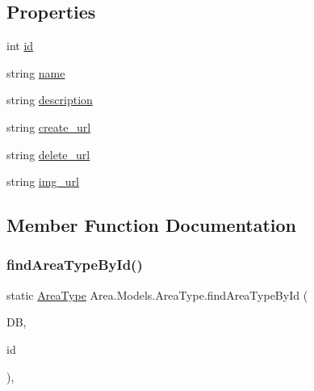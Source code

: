 \subsection*{Properties}
\begin{DoxyCompactItemize}
\item 
int \mbox{\hyperlink{classArea_1_1Models_1_1AreaType_a334470e1882a0d27aad7dc0a180e5b0b}{id}}
\item 
string \mbox{\hyperlink{classArea_1_1Models_1_1AreaType_a96fa53a9c8d977d9a3afa7e501a862fa}{name}}
\item 
string \mbox{\hyperlink{classArea_1_1Models_1_1AreaType_a9e4921cb37dd5d3eca61455c28f399b0}{description}}
\item 
string \mbox{\hyperlink{classArea_1_1Models_1_1AreaType_a57a0e360895801c2f41c626d27becc17}{create\+\_\+url}}
\item 
string \mbox{\hyperlink{classArea_1_1Models_1_1AreaType_a5714a6004dd5fab7a60158bfcb609da8}{delete\+\_\+url}}
\item 
string \mbox{\hyperlink{classArea_1_1Models_1_1AreaType_a3db4de9d040e34f86dde99b0ecb10093}{img\+\_\+url}}
\end{DoxyCompactItemize}


\subsection{Member Function Documentation}
\mbox{\label{classArea_1_1Models_1_1AreaType_a06f11a87a3ffb86fe075d5db4bba48b2}} 
\subsubsection{\texorpdfstring{find\+Area\+Type\+By\+Id()}{findAreaTypeById()}}
{\footnotesize\ttfamily static \mbox{\hyperlink{classArea_1_1Models_1_1AreaType}{Area\+Type}} Area.\+Models.\+Area\+Type.\+find\+Area\+Type\+By\+Id (\begin{DoxyParamCaption}\item[{\mbox{\hyperlink{classArea_1_1DAT_1_1AreaDbContext}{Area\+Db\+Context}}}]{DB,  }\item[{int}]{id }\end{DoxyParamCaption})\hspace{0.3cm}{\ttfamily [inline]}, {\ttfamily [static]}}



